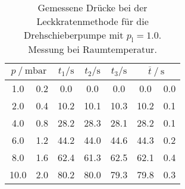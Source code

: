 \begin{table} 
\centering 
\caption{Gemessene Drücke bei der Leckkratenmethode für die Drehschieberpumpe mit $p_{\mathrm{l}}=1.0$. Messung bei Raumtemperatur.} 
\label{tab: leck_dreh_leck_1.0.pdf} 
\begin{tabular}{S[table-format=1.1]@{${}\pm{}$} S[table-format=1.1] S S S S[table-format=1.1]@{${}\pm{}$} S[table-format=1.1] } 
\toprule  
{} & {$t_1 / \si{ \second}$} & {$t_2 / \si{ \second}$} & {$t_3 / \si{ \second}$} &  \\ 
 & 0.2 & 0.0 & 0.0 & 0.0 & 0.0 & 0.0\\ 
2.0 & 0.4 & 10.2 & 10.1 & 10.3 & 10.2 & 0.1\\ 
4.0 & 0.8 & 28.2 & 28.3 & 28.1 & 28.2 & 0.1\\ 
6.0 & 1.2 & 44.2 & 44.0 & 44.6 & 44.3 & 0.2\\ 
8.0 & 1.6 & 62.4 & 61.3 & 62.5 & 62.1 & 0.4\\ 
10.0 & 2.0 & 80.2 & 80.0 & 79.3 & 79.8 & 0.3\\ 
\bottomrule 
\end{tabular} 
\end{table}